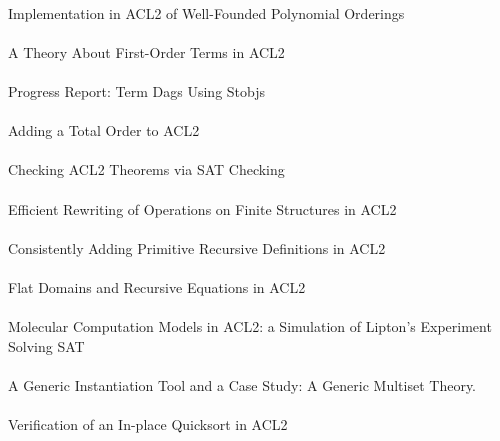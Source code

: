 \documentclass{article}
\begin{document}
\cite{02-bulo-polynomial} \\
Implementation in ACL2 of Well-Founded Polynomial Orderings \\

\cite{02-reina-terms} \\
A Theory About First-Order Terms in ACL2 \\

\cite{02-reina-dags} \\
Progress Report: Term Dags Using Stobjs \\

\cite{02-manolios-adding} \\
Adding a Total Order to ACL2 \\

\cite{02-sumners-sat} \\
Checking ACL2 Theorems via SAT Checking \\

\cite{02-kaufmann-rewriting} \\
Efficient Rewriting of Operations on Finite Structures in ACL2 \\

\cite{02-cowles-primitive} \\
Consistently Adding Primitive Recursive Definitions in ACL2 \\

\cite{02-cowles-flat} \\
Flat Domains and Recursive Equations in ACL2 \\

\cite{02-martin-molecular} \\
Molecular Computation Models in ACL2: a Simulation of Lipton's Experiment Solving SAT \\

\cite{02-martin-instantiation} \\
A Generic Instantiation Tool and a Case Study: A Generic Multiset Theory. \\

\cite{02-ray-quicksort} \\
Verification of an In-place Quicksort in ACL2 \\
\end{document}
